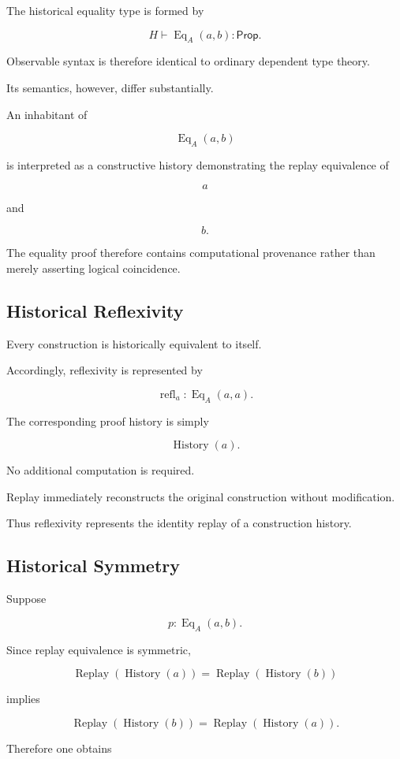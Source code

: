 \documentclass[12pt,oneside]{article}
\theoremstyle{definition}
\theoremstyle{remark}
\newcommand{\Prop}{\mathsf{Prop}}
\DeclareMathOperator{\History}{History}
\DeclareMathOperator{\Replay}{Replay}
\begin{document}
The historical equality type is formed by

\[
H
\vdash
\operatorname{Eq}_A(a,b)
:
\Prop.
\]

Observable syntax is therefore identical to ordinary dependent type theory.

Its semantics, however, differ substantially.

An inhabitant of

\[
\operatorname{Eq}_A(a,b)
\]

is interpreted as a constructive history demonstrating the replay equivalence
of

\[
a
\]

and

\[
b.
\]

The equality proof therefore contains computational provenance rather than
merely asserting logical coincidence.

\subsection{Historical Reflexivity}

Every construction is historically equivalent to itself.

Accordingly, reflexivity is represented by

\[
\operatorname{refl}_a
:
\operatorname{Eq}_A(a,a).
\]

The corresponding proof history is simply

\[
\History(a).
\]

No additional computation is required.

Replay immediately reconstructs the original construction without modification.

Thus reflexivity represents the identity replay of a construction history.

\subsection{Historical Symmetry}

Suppose

\[
p
:
\operatorname{Eq}_A(a,b).
\]

Since replay equivalence is symmetric,

\[
\Replay(\History(a))
=
\Replay(\History(b))
\]

implies

\[
\Replay(\History(b))
=
\Replay(\History(a)).
\]

Therefore one obtains
\end{document}
